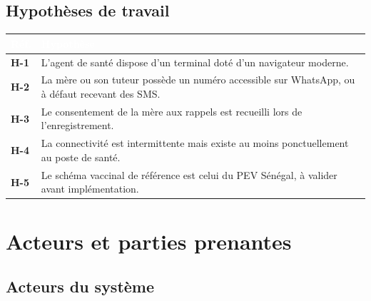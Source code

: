 \documentclass[11pt,a4paper]{article}
\newcommand{\rid}[1]{{\sffamily\bfseries\footnotesize\color{primary}#1}}
\newcommand{\hd}[1]{\textcolor{white}{\sffamily\bfseries\small #1}}
\newcommand{\rowhead}{\rowcolor{primary}}
\begin{document}
\subsection{Hypothèses de travail}

\noindent
\begin{tabularx}{\textwidth}{@{}C{1.3cm} L@{}}
\toprule
\rowhead \hd{Réf.} & \hd{Hypothèse} \\
\midrule
\rid{H-1} & L'agent de santé dispose d'un terminal doté d'un navigateur moderne. \\
\rid{H-2} & La mère ou son tuteur possède un numéro accessible sur WhatsApp, ou à défaut recevant des SMS. \\
\rid{H-3} & Le consentement de la mère aux rappels est recueilli lors de l'enregistrement. \\
\rid{H-4} & La connectivité est intermittente mais existe au moins ponctuellement au poste de santé. \\
\rid{H-5} & Le schéma vaccinal de référence est celui du PEV Sénégal, à valider avant implémentation. \\
\bottomrule
\end{tabularx}

\section{Acteurs et parties prenantes}

\subsection{Acteurs du système}
\end{document}

